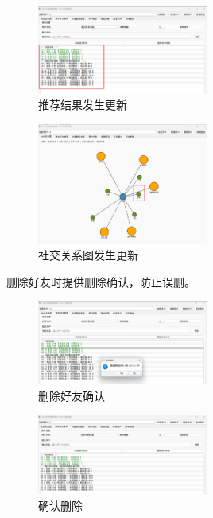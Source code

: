 \documentclass[12pt,a4paper]{article}
\begin{document}
\begin{figure}[H]
    \centering
    \includegraphics[width=0.5\textwidth]{pt2-18.png}
    \caption{推荐结果发生更新}
\end{figure}

\begin{figure}[H]
    \centering
    \includegraphics[width=0.5\textwidth]{pt2-19.png}
    \caption{社交关系图发生更新}
\end{figure}

删除好友时提供删除确认，防止误删。

\begin{figure}[H]
    \centering
    \includegraphics[width=0.5\textwidth]{pt2-20.png}
    \caption{删除好友确认}
\end{figure}

\begin{figure}[H]
    \centering
    \includegraphics[width=0.5\textwidth]{pt2-23.png}
    \caption{确认删除}
\end{figure}
\end{document}
